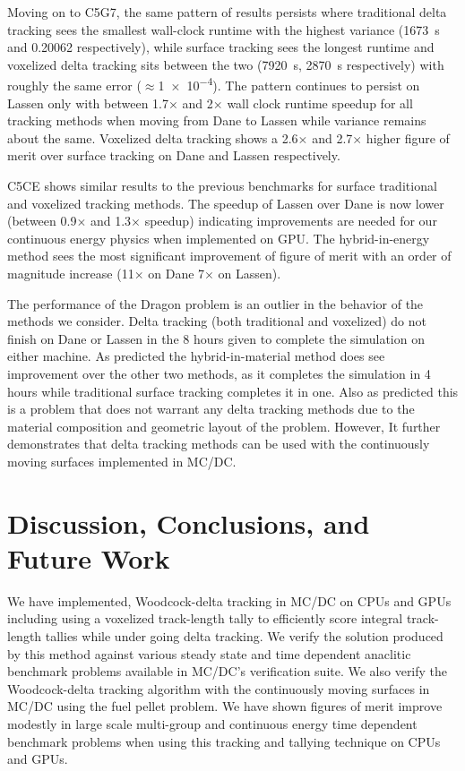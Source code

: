Moving on to C5G7, the same pattern of results persists where traditional delta tracking sees the smallest wall-clock runtime with the highest variance (\SI{1673}{\s} and \num{0.20062} respectively), while surface tracking sees the longest runtime and voxelized delta tracking sits between the two (\SI{7920}{\s}, \SI{2870}{\s} respectively) with roughly the same error ($\approx$\num{1e-4}).
The pattern continues to persist on Lassen only with between \num{1.7}$\times$ and \num{2}$\times$ wall clock runtime speedup for all tracking methods when moving from Dane to Lassen while variance remains about the same.
Voxelized delta tracking shows a \num{2.6}$\times$ and \num{2.7}$\times$ higher figure of merit over surface tracking on Dane and Lassen respectively.

C5CE shows similar results to the previous benchmarks for surface traditional and voxelized tracking methods.
The speedup of Lassen over Dane is now lower (between \num{0.9}$\times$ and \num{1.3}$\times$ speedup) indicating improvements are needed for our continuous energy physics when implemented on GPU.
The hybrid-in-energy method sees the most significant improvement of figure of merit with an order of magnitude increase (\num{11}$\times$ on Dane \num{7}$\times$ on Lassen).


The performance of the Dragon problem is an outlier in the behavior of the methods we consider.
Delta tracking (both traditional and voxelized) do not finish on Dane or Lassen in the 8 hours given to complete the simulation on either machine.
As predicted the hybrid-in-material method does see improvement over the other two methods, as it completes the simulation in 4 hours while traditional surface tracking completes it in one.
Also as predicted this is a problem that does not warrant any delta tracking methods due to the material composition and geometric layout of the problem.
However, It further demonstrates that delta tracking methods can be used with the continuously moving surfaces implemented in MC/DC.


\section{Discussion, Conclusions, and Future Work}
\label{disucssions}

We have implemented, Woodcock-delta tracking in MC/DC on CPUs and GPUs including using a voxelized track-length tally to efficiently score integral track-length tallies while under going delta tracking.
We verify the solution produced by this method against various steady state and time dependent anaclitic benchmark problems available in MC/DC's verification suite.
We also verify the Woodcock-delta tracking algorithm with the continuously moving surfaces in MC/DC using the fuel pellet problem.
We have shown figures of merit improve modestly in large scale multi-group and continuous energy time dependent benchmark problems when using this tracking and tallying technique on CPUs and GPUs.

